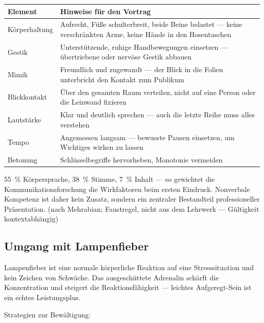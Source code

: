 \documentclass[11pt, a4paper]{article}
\begin{document}
\begin{center}
\begin{tabular}{p{3.5cm} p{9cm}}
\toprule
\textbf{Element} & \textbf{Hinweise für den Vortrag}\\
\midrule
Körperhaltung & Aufrecht, Füße schulterbreit, beide Beine belastet — keine verschränkten Arme,
                keine Hände in den Hosentaschen\\
\addlinespace
Gestik & Unterstützende, ruhige Handbewegungen einsetzen — übertriebene oder nervöse Gestik
         abbauen\\
\addlinespace
Mimik & Freundlich und zugewandt — der Blick in die Folien unterbricht den Kontakt zum Publikum\\
\addlinespace
Blickkontakt & Über den gesamten Raum verteilen, nicht auf eine Person oder die Leinwand fixieren\\
\addlinespace
Lautstärke & Klar und deutlich sprechen — auch die letzte Reihe muss alles verstehen\\
\addlinespace
Tempo & Angemessen langsam — bewusste Pausen einsetzen, um Wichtiges wirken zu lassen\\
\addlinespace
Betonung & Schlüsselbegriffe hervorheben, Monotonie vermeiden\\
\bottomrule
\end{tabular}
\end{center}

\begin{merksatz}[title={\bfseries Merke: 55-38-7-Regel}]
55~\% Körpersprache, 38~\% Stimme, 7~\% Inhalt --- so gewichtet die Kommunikationsforschung
die Wirkfaktoren beim ersten Eindruck. Nonverbale Kompetenz ist daher kein Zusatz,
sondern ein zentraler Bestandteil professioneller Präsentation.
(nach Mehrabian; Faustregel, nicht aus dem Lehrwerk --- Gültigkeit kontextabhängig)
\end{merksatz}

\subsection{Umgang mit Lampenfieber}

Lampenfieber ist eine normale körperliche Reaktion auf eine Stresssituation und kein Zeichen
von Schwäche. Das ausgeschüttete Adrenalin schärft die Konzentration und steigert die
Reaktionsfähigkeit --- leichtes Aufgeregt-Sein ist ein echtes Leistungsplus.

Strategien zur Bewältigung:
\end{document}
